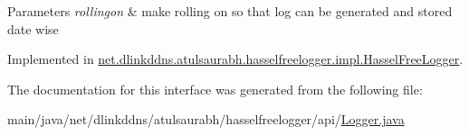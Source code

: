 \begin{DoxyParams}{Parameters}
{\em rollingon} & make rolling on so that log can be generated and stored date wise \\
\hline
\end{DoxyParams}


Implemented in \mbox{\hyperlink{classnet_1_1dlinkddns_1_1atulsaurabh_1_1hasselfreelogger_1_1impl_1_1_hassel_free_logger_a9ef8b4f7c9615f50c03f168f1b949f64}{net.\+dlinkddns.\+atulsaurabh.\+hasselfreelogger.\+impl.\+Hassel\+Free\+Logger}}.



The documentation for this interface was generated from the following file\+:\begin{DoxyCompactItemize}
\item 
main/java/net/dlinkddns/atulsaurabh/hasselfreelogger/api/\mbox{\hyperlink{_logger_8java}{Logger.\+java}}\end{DoxyCompactItemize}
